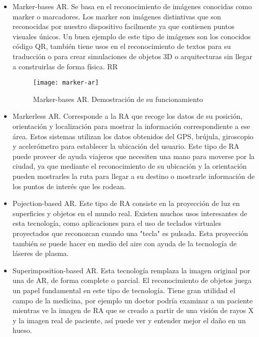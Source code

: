 \begin{itemize}
	\item 
	Marker-bases AR. Se basa en el reconocimiento de imágenes conocidas como marker o marcadores. Los marker son imágenes distintivas que son reconocidas por nuestro dispositivo facilmente ya que contienen puntos visuales únicos. Un buen ejemplo de este tipo de imágenes son los conocidos código QR\cite{URL::CodigoQR}, también tiene usos en el reconocimiento de textos para su traducción o para crear simulaciones de objetos 3D o arquitecturas sin llegar a construirlas de forma física. RR

	\begin{figure}[h]
		\centering
		\texttt{[image: marker-ar]}
		\caption{Marker-bases AR. Demostración de su funcionamiento}
		\label{fig:markerAR}
	\end{figure}

	\item Markerless AR. Corresponde a la RA que recoge los datos de su posición, orientación y localización para mostrar la información correspondiente a ese área. Estos sistemas utilizan los datos obtenidos del GPS, brújula, giroscopio y acelerómetro para establecer la ubicación del usuario. Este tipo de RA puede proveer de ayuda viajeros que necesiten una mano para moverse por la ciudad, ya que mediante el reconocimiento de su ubicación y la orientación pueden mostrarles la ruta para llegar a su destino o mostrarle información de los puntos de interés que les rodean. 
 
	\item Pojection-based AR. Este tipo de RA consiste en la proyección de luz en superficies y objetos en el mundo real. Existen muchos usos interesantes de esta tecnología, como aplicaciones para el uso de teclados virtuales proyectados que reconozcan cuando una "tecla" es pulsada. Esta proyección también se puede hacer en medio del aire con ayuda de la tecnología de láseres de plasma.

	\item Superimposition-based AR. Esta tecnología remplaza la imagen original por una de AR, de forma complete o parcial. El reconocimiento de objetos juega un papel fundamental en este tipo de tecnología. Tiene gran utilidad el campo de la medicina, por ejemplo un doctor podría examinar a un paciente mientras ve la imagen de RA que se creado a partir de una visión de rayos X y la imagen real de paciente, así puede ver y entender mejor el daño en un hueso.
\end{itemize} 


